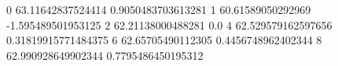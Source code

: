 0 63.11642837524414 0.9050483703613281
1 60.61589050292969 -1.595489501953125
2 62.21138000488281 0.0
4 62.529579162597656 0.31819915771484375
6 62.65705490112305 0.4456748962402344
8 62.990928649902344 0.7795486450195312
